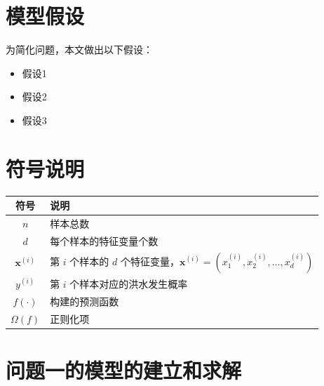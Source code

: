 \documentclass[withoutpreface,bwprint]{cumcmthesis}
\begin{document}
\newpage
\section{模型假设}

为简化问题，本文做出以下假设：

\begin{itemize}[itemindent=2em]
\item 假设1
\item 假设2
\item 假设3
\end{itemize}


\section{符号说明}









\begin{table}[H]
	\centering
	
	\begin{tabularx}{\textwidth}{CL}
		\toprule
		符号    & 说明    \\
		\midrule
		$n$ & 样本总数 \\
		$d$ & 每个样本的特征变量个数 \\
		$\boldsymbol{x}^{(i)}$ & 第 $i$ 个样本的 $d$ 个特征变量，$\boldsymbol{x}^{(i)} = (x_1^{(i)}, x_2^{(i)}, \dots, x_d^{(i)})$ \\
		$y^{(i)}$ & 第 $i$ 个样本对应的洪水发生概率 \\
		$f(\cdot)$ & 构建的预测函数 \\
		$\Omega(f)$ & 正则化项 \\

		\bottomrule
	\end{tabularx}
	
	\label{tab:符号说明}
\end{table}











\newpage
\section{问题一的模型的建立和求解}
\end{document}
